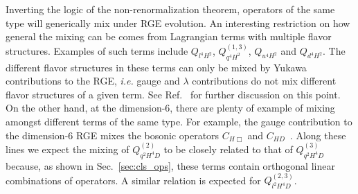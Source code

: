 Inverting the logic of the non-renormalization theorem, operators of the same type will generically mix under RGE evolution.
An interesting restriction on how general the mixing can be comes from Lagrangian terms with multiple flavor structures.
Examples of such terms include $Q_{l^4H^2}$, $Q_{q^4H^2}^{(1,3)}$, $Q_{u^4H^2}$ and $Q_{d^4H^2}$.
The different flavor structures in these terms can only be mixed by Yukawa contributions to the RGE, \textit{i.e.} gauge and $\lambda$ contributions do not mix different flavor structures of a given term.
See Ref.~\cite{Alonso:2014zka} for further discussion on this point.
On the other hand, at the dimension-6, there are plenty of example of mixing amongst different terms of the same type.
For example, the gauge contribution to the dimension-6 RGE mixes the bosonic operators $C_{H\Box}$ and $C_{HD}$~\cite{Alonso:2013hga}.
Along these lines we expect the mixing of $Q_{q^2H^4D}^{(2)}$ to be closely related to that of $Q_{q^2H^4D}^{(3)}$ because, as shown in Sec.~\ref{sec:cls_ops}, these terms contain orthogonal linear combinations of operators.
A similar relation is expected for $Q_{l^2H^4D}^{(2, 3)}$.

